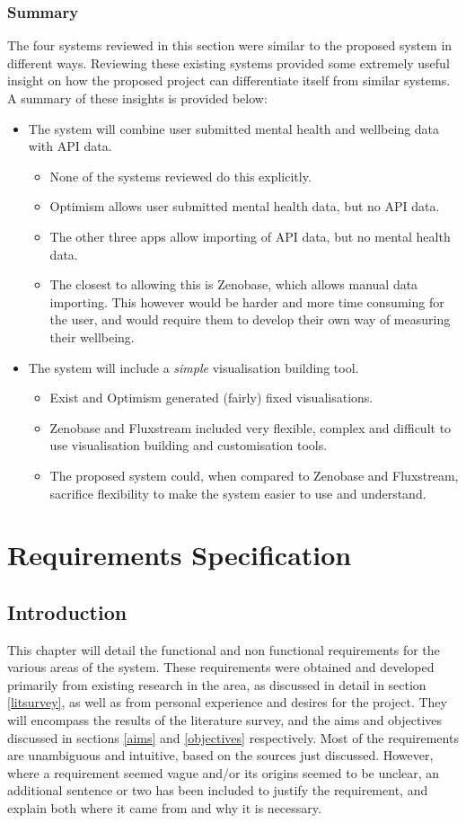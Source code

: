 \documentclass[11pt,openright,a4paper]{report}
\begin{document}
\subsection{Summary}
The four systems reviewed in this section were similar to the proposed system in different ways. Reviewing these existing systems provided some extremely useful insight on how the proposed project can differentiate itself from similar systems. A summary of these insights is provided below:
\begin{itemize}
\item The system will combine user submitted mental health and wellbeing data with API data.
  \begin{itemize}
  \item None of the systems reviewed do this explicitly.
  \item Optimism allows user submitted mental health data, but no API data.
  \item The other three apps allow importing of API data, but no mental health data.
  \item The closest to allowing this is Zenobase, which allows manual data importing. This however would be harder and more time consuming for the user, and would require them to develop their own way of measuring their wellbeing.
  \end{itemize}
\item The system will include a \emph{simple} visualisation building tool.
  \begin{itemize}
  \item Exist and Optimism generated (fairly) fixed visualisations.
  \item Zenobase and Fluxstream included very flexible, complex and difficult to use visualisation building and customisation tools.
  \item The proposed system could, when compared to Zenobase and Fluxstream, sacrifice flexibility to make the system easier to use and understand.
  \end{itemize}
\end{itemize}

\chapter{Requirements Specification}
\section{Introduction}
This chapter will detail the functional and non functional requirements for the various areas of the system. These requirements were obtained and developed primarily from existing research in the area, as discussed in detail in section \ref{litsurvey}, as well as from personal experience and desires for the project. They will encompass the results of the literature survey, and the aims and objectives discussed in sections \ref{aims} and \ref{objectives} respectively. Most of the requirements are unambiguous and intuitive, based on the sources just discussed. However, where a requirement seemed vague and/or its origins seemed to be unclear, an additional sentence or two has been included to justify the requirement, and explain both where it came from and why it is necessary.
\end{document}
